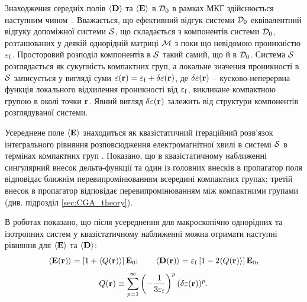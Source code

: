 \documentclass[14pt,twoside]{vakthesis}
\begin{document}
Знаходження середніх полів $\langle{{\bf D}}\rangle$ та $\langle{{\bf E}}\rangle$ в ${\cal D}_0$ в рамках МКГ здійснюється наступним чином~\cite{Sushko2017}.
Вважається, що ефективний відгук системи ${\cal D}_0$ еквівалентний відгуку допоміжної системи $\cal{S}$, що складається з компонентів системи ${\cal D}_0$, розташованих у деякій однорідній матриці $\cal{M}$ з поки що невідомою проникністю $\varepsilon_{\rm f}$. Просторовий розподіл компонентів в $\cal{S}$ такий самий, що й в ${\cal D}_0$. Система $\cal{S}$ розглядається як сукупність  компактних груп, а локальне значення проникності в $\cal{S}$ записується у вигляді суми $\varepsilon({\bf r}) = \varepsilon_{\rm f} + \delta\varepsilon({\bf r})$,
де $\delta\varepsilon({\bf r})$ -- кусково-неперервна функція локального відхилення проникності від $\varepsilon_{\rm f}$, викликане компактною групою в околі точки ${\bf r}$. Явний вигляд $\delta\varepsilon({\bf r})$ залежить від структури компонентів розглядуваної системи.

Усереднене поле $\langle{{\bf E}}\rangle$ знаходиться як квазістатичний ітераційний розв'язок інтегрального рівняння розповсюдження електромагнітної хвилі в системі $\cal{S}$ в термінах компактних груп \cite{Sushko2007,Sushko2009}. Показано, що в квазістатичному наближенні сингулярний внесок дельта-функції та один із головних внесків в пропагатор поля відповідає ближнім перевипромінюванням всередині компактних групах; третій внесок в пропагатор відповідає перевипромінюванням між компактними групами (див. підрозділ \ref{sec:CGA_theory}).

В роботах \cite{Sushko2007, Sushko2017} показано, що після усереднення для макроскопічно однорідних та ізотропних систем у квазістатичному наближенні можна отримати наступні рівняння для $\langle {\bf E} \rangle$ та $\langle {\bf D} \rangle$:
\begin{equation}\label{eq:ED_average_CGA_origin}
\langle {\bf E} ({\bf r}) \rangle = \left[ 1 + \langle {Q}({\bf r}) \rangle \right] {\bf E}_0;
\qquad
\langle {\bf D} ({\bf r}) \rangle = \varepsilon_{\rm f} \left[ 1 - 2\langle {Q}({\bf r}) \rangle \right] {\bf E}_0,
\end{equation}
\begin{equation}\label{eq:Q_CGA_origin}
{Q}({\bf r}) \equiv \sum\limits_{p=1}^{\infty} \left( - \frac{1}{3{\varepsilon}_{\rm f}} \right)^p (\delta{\varepsilon}({\bf r}))^p.
\end{equation}
\end{document}
